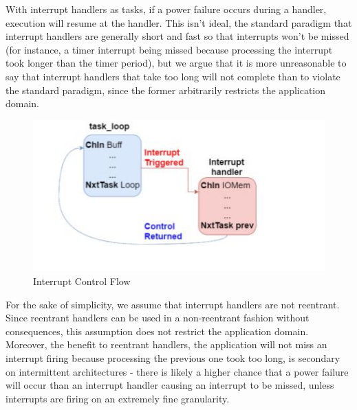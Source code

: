 \documentclass[11pt]{sensys-proc}
\begin{document}
With interrupt handlers as tasks, if a power failure occurs during a
handler, execution will resume at the handler. This isn't ideal, the
standard paradigm that interrupt handlers are generally short and fast
so that interrupts won't be missed (for instance, a timer interrupt
being missed because processing the interrupt took longer than the
timer period), but we argue that it is more unreasonable to say
that interrupt handlers that take too long will not complete than
to violate the standard paradigm, since the former arbitrarily restricts
the application domain.

\begin{figure}[ht]
\begin{minipage}[b]{.9\columnwidth}
  \includegraphics[width=0.7\columnwidth]{figs/int_ctrl_flow}
  \caption{Interrupt Control Flow}\label{intCtrlFlow}
\end{minipage}
\end{figure}

For the sake of simplicity, we assume that interrupt handlers are not
reentrant. Since reentrant handlers can be used in a non-reentrant fashion
without consequences, this assumption does not restrict the application domain.
Moreover, the benefit to reentrant handlers, the application will not miss an
interrupt firing because processing the previous one took too long, is
secondary on intermittent architectures - there is likely a higher chance that
a power failure will occur than an interrupt handler causing an interrupt to be
missed, unless interrupts are firing on an extremely fine granularity.
\end{document}

